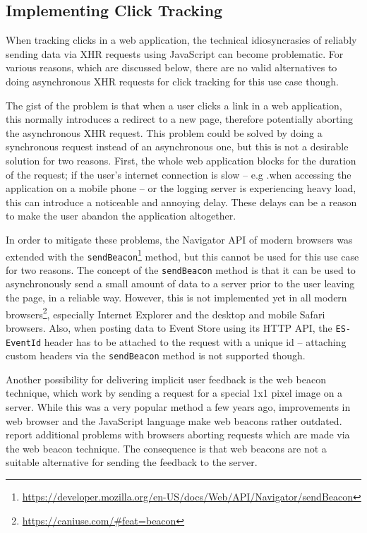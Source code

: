\subsection{Implementing Click Tracking}
\label{subsec:implementation:client:problems}

When tracking clicks in a web application, the technical idiosyncrasies of reliably sending data via \ac{XHR} requests using JavaScript can become problematic.
For various reasons, which are discussed below, there are no valid alternatives to doing asynchronous \ac{XHR} requests for click tracking for this use case though.

The gist of the problem is that when a user clicks a link in a web application, this normally introduces a redirect to a new page, therefore potentially aborting the asynchronous \ac{XHR} request\cite{Kohavi2010}.
This problem could be solved by doing a synchronous request instead of an asynchronous one, but this is not a desirable solution for two reasons.
First, the whole web application blocks for the duration of the request; if the user's internet connection is slow -- e.g .when accessing the application on a mobile phone -- or the logging server is experiencing heavy load, this can introduce a noticeable and annoying delay.
These delays can be a reason to make the user abandon the application altogether\cite{Kohavi2010,Dmitriev2017}.

In order to mitigate these problems, the Navigator \ac{API} of modern browsers was extended with the \texttt{sendBeacon}\footnote{\url{https://developer.mozilla.org/en-US/docs/Web/API/Navigator/sendBeacon}} method, but this cannot be used for this use case for two reasons.
The concept of the \texttt{sendBeacon} method is that it can be used to asynchronously send a small amount of data to a server prior to the user leaving the page, in a reliable way.
However, this is not implemented yet in all modern browsers\footnote{\url{https://caniuse.com/\#feat=beacon}}, especially Internet Explorer and the desktop and mobile Safari browsers.
Also, when posting data to Event Store using its \ac{HTTP} \ac{API}, the \texttt{ES-EventId} header has to be attached to the request with a unique id -- attaching custom headers via the \texttt{sendBeacon} method is not supported though.

Another possibility for delivering implicit user feedback is the web beacon technique, which work by sending a request for a special 1x1 pixel image on a server.
While this was a very popular method a few years ago, improvements in web browser and the JavaScript language make web beacons rather outdated.
\citet{Kohavi2012} report additional problems with browsers aborting requests which are made via the web beacon technique.
The consequence is that web beacons are not a suitable alternative for sending the feedback to the server.

